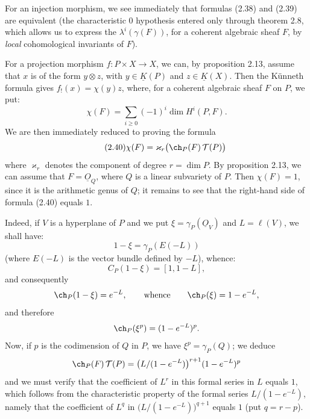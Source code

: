 For an injection morphism, we see immediately that formulas (2.38) and (2.39) are equivalent (the characteristic \(0\) hypothesis entered only through theorem 2.8, which allows us to express the \(\lambda^i(\gamma(F))\), for a coherent algebraic sheaf \(F\), by \emph{local} cohomological invariants of \(F\)).

For a projection morphism \(f:P\times X\longrightarrow X\), we can, by proposition 2.13, assume that \(x\) is of the form \(y\otimes z\), with \(y\in\underline K(P)\) and
%
\(z\in\underline K(X)\).
Then the K\"unneth formula gives \(f_!(x)=\chi(y)z\), where, for a coherent algebraic sheaf \(F\) on \(P\), we put:
\[
  \chi(F)=\sum_{i\geq 0}(-1)^i\dim H^i(P,F).
\]
We are then immediately reduced to proving the formula
\begin{equation}\tag{2.40}
  \chi(F)=\varkappa_r\bigl(\ch_P(F)\,\mathcal T(P)\bigr)
\end{equation}
where \(\varkappa_r\) denotes the component of degree \(r=\dim P\). By proposition 2.13, we can assume that \(F=\underline{O}_Q\), where \(Q\) is a linear subvariety of \(P\). Then \(\chi(F)=1\), since it is the arithmetic genus of \(Q\); it remains to see that the right-hand side of formula (2.40) equals \(1\).

Indeed, if \(V\) is a hyperplane of \(P\) and we put \(\xi=\gamma_P(\underline{O}_V)\) and \(L=\ell(V)\), we shall have:
\[
  1-\xi=\gamma_P(E(-L))
\]
(where \(E(-L)\) is the vector bundle defined by \(-L\)), whence:
\[
  C_P(1-\xi)=[1,1-L],
\]
and consequently
\[
  \ch_P(1-\xi)=e^{-L},\qquad\text{whence}\qquad \ch_P(\xi)=1-e^{-L},
\]
and therefore
\[
  \ch_P(\xi^p)=(1-e^{-L})^p.
\]
Now, if \(p\) is the codimension of \(Q\) in \(P\), we have \(\xi^p=\gamma_P(Q)\); we deduce
\[
  \ch_P(F)\,\mathcal T(P)
  =
  \bigl(L/(1-e^{-L})\bigr)^{r+1}(1-e^{-L})^p
\]
and we must verify that the coefficient of \(L^r\) in this formal series in \(L\) equals \(1\), which follows from the characteristic property of the formal series \(L/(1-e^{-L})\), namely that the coefficient of \(L^q\) in \(\bigl(L/(1-e^{-L})\bigr)^{q+1}\) equals \(1\) (put \(q=r-p\)).


